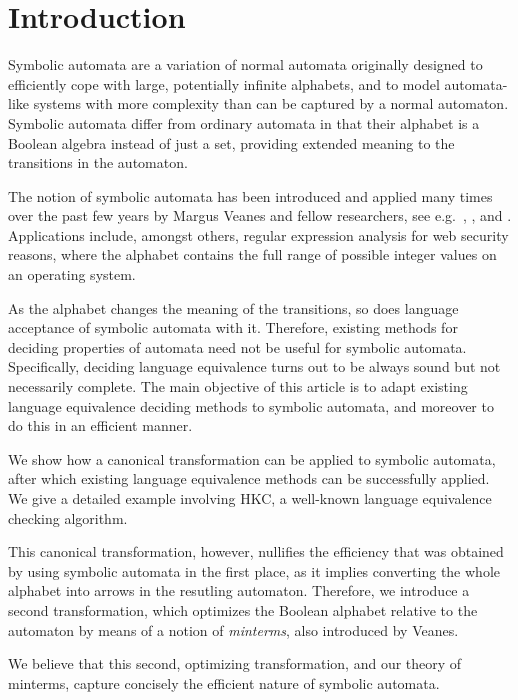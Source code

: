 
\section{Introduction}

Symbolic automata are a variation of normal automata originally designed to efficiently cope with large, potentially infinite alphabets, and to model automata-like systems with more complexity than can be captured by a normal automaton. Symbolic automata differ from ordinary automata in that their alphabet is a Boolean algebra instead of just a set, providing extended meaning to the transitions in the automaton.

The notion of symbolic automata has been introduced and applied many times over the past few years by Margus Veanes and fellow researchers, see e.g.~\citep{veanes2}, \citep{veanes3}, and \citep{veanes}. Applications include, amongst others, regular expression analysis for web security reasons, where the alphabet contains the full range of possible integer values on an operating system.

As the alphabet changes the meaning of the transitions, so does language acceptance of symbolic automata with it. Therefore, existing methods for deciding properties of automata need not be useful for symbolic automata. Specifically, deciding language equivalence turns out to be always sound but not necessarily complete. The main objective of this article is to adapt existing language equivalence deciding methods to symbolic automata, and moreover to do this in an efficient manner.

We show how a canonical transformation can be applied to symbolic automata, after which existing language equivalence methods can be successfully applied. We give a detailed example involving HKC, a well-known language equivalence checking algorithm.

This canonical transformation, however, nullifies the efficiency that was obtained by using symbolic automata in the first place, as it implies converting the whole alphabet into arrows in the resutling automaton. Therefore, we introduce a second transformation, which optimizes the Boolean alphabet relative to the automaton by means of a notion of \emph{minterms}, also introduced by Veanes.

We believe that this second, optimizing transformation, and our theory of minterms, capture concisely the efficient nature of symbolic automata.



